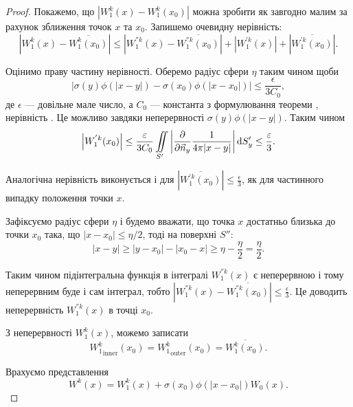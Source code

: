 \begin{proof}
	Покажемо, що $|W_1^k(x) - W_1^k(x_0)|$ можна зробити як завгодно малим за рахунок зближення точок $x$ та $x_0$. Запишемо очевидну нерівність:
	\begin{equation}
		\left| W_1^k(x) - \overline{W_1^k(x_0)} \right| \le \left| W_1^{''k}(x) - \overline{W_1^{''k}(x_0)} \right| + \left| W_1^{'k}(x) \right | + \left| \overline{W_1^{'k}(x_0)} \right|.
	\end{equation}

	Оцінимо праву частину нерівності. Оберемо радіус сфери $\eta$ таким чином щоби
	\begin{equation}
		\Big| \sigma(y) \phi(|x - y|) - \sigma(x_0) \phi(|x - x_0|) \Big| \le \frac{\epsilon}{3 C_0},
	\end{equation}
		де $\epsilon$ --- довільне мале число, а $C_0$ --- константа з формулювання теореми , нерівність . Це можливо завдяки неперервності $\sigma(y) \phi(|x - y|)$. Таким чином
	\begin{equation}
		\left| W_1^{'k} (x_0) \right| \le \frac{\varepsilon}{3 C_0} \displaystyle\iint\limits_{S'} \left| \frac{\partial}{\partial \vec n_y} \frac{1}{4 \pi |x - y|} \right| \mathop{}\!\mathrm{d} S_y' \le \frac{\varepsilon}{3}.
	\end{equation}

	Аналогічна нерівність виконується і для $\left| \overline{W_1^{'k}(x_0)} \right| \le \frac{\epsilon}{3}$, як для частинного випадку положення точки $x$. \medskip

	Зафіксуємо радіус сфери $\eta$ і будемо вважати, що точка $x$ достатньо близька до точки $x_0$ така, що $|x - x_0| \le \eta/2$, тоді на поверхні $S''$:
	\begin{equation}
		|x - y| \ge |y - x_0| - |x_0 - x| \ge \eta - \frac{\eta}{2} = \frac{\eta}{2}.
	\end{equation}

	Таким чином підінтегральна функція в інтегралі $W_1^{''k}(x)$ є неперервною і тому неперервним буде і сам інтеграл, тобто $\left| W_1^{''k}(x) - \overline{W_1^{''k}(x_0)} \right| \le \frac{\epsilon}{3}$. Це доводить неперервність $W_1^{''k}(x)$ в точці $x_0$. \medskip

	З неперервності $W_1^k(x)$, можемо записати 
	\begin{equation}
		{W_1^k}_{\text{inner}}(x_0) = {W_1^k}_{\text{outer}}(x_0) = \overline{W_1^k(x_0)}.
	\end{equation}

	Врахуємо представлення 
	\begin{equation}
		W^k(x) = W_1^k(x) + \sigma(x_0) \phi(|x - x_0|) W_0(x).
	\end{equation}


\end{proof}

